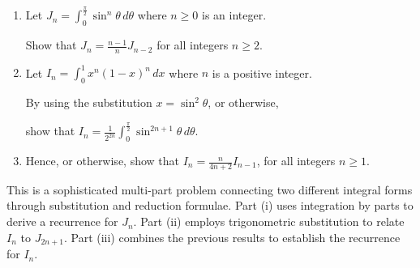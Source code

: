 
\begin{problem}
\begin{enumerate}
    \item[(i)] Let $J_n = \int_{0}^{\frac{\pi}{2}} \sin^n \theta \, d\theta$ where $n \ge 0$ is an integer.
    
    Show that $J_n = \frac{n-1}{n}J_{n-2}$ for all integers $n \ge 2$.

    \item[(ii)] Let $I_n = \int_{0}^{1} x^n(1-x)^n \, dx$ where $n$ is a positive integer.
    
    By using the substitution $x = \sin^2 \theta$, or otherwise,
    
    show that $I_n = \frac{1}{2^{2n}} \int_{0}^{\frac{\pi}{2}} \sin^{2n+1} \theta \, d\theta$.

    \item[(iii)] Hence, or otherwise, show that $I_n = \frac{n}{4n+2}I_{n-1}$, for all integers $n \ge 1$.
\end{enumerate}
\end{problem}

\begin{hint}
This is a sophisticated multi-part problem connecting two different integral forms through substitution and reduction formulae. Part (i) uses integration by parts to derive a recurrence for $J_n$. Part (ii) employs trigonometric substitution to relate $I_n$ to $J_{2n+1}$. Part (iii) combines the previous results to establish the recurrence for $I_n$.
\end{hint}

